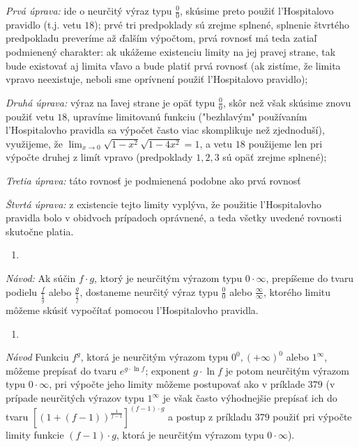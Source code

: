 \textit{Prvá úprava:}
ide o neurčitý výraz typu $\frac{0}{0}$, skúsime preto použiť l'Hospitalovo pravidlo (t.j. vetu $18$); prvé tri predpoklady sú zrejme splnené, splnenie štvrtého predpokladu preveríme až ďalším výpočtom, prvá rovnosť má teda zatiaľ podmienený charakter: ak ukážeme existenciu limity na jej pravej strane, tak bude existovať aj limita vľavo a bude platiť prvá rovnosť (ak zistíme, že limita vpravo neexistuje, neboli sme oprívnení použiť l'Hospitalovo pravidlo);

\textit{Druhá úprava:}
výraz na ľavej strane je opäť typu $\frac{0}{0}$, skôr než však skúsime znovu použiť vetu $18$, upravíme limitovanú funkciu ("bezhlavým" používaním l'Hospitalovho pravidla sa výpočet často viac skomplikuje než zjednoduší), využijeme, že $\lim_{x\rightarrow 0}\sqrt{1-x^2}\sqrt{1-4x^2}=1$, a vetu $18$ použijeme len pri výpočte druhej z limít vpravo (predpoklady $1,2,3$ sú opäť zrejme splnené);

\textit{Tretia úprava:}
táto rovnosť je podmienená podobne ako prvá rovnosť

\textit{Štvrtá úprava:}
z existencie tejto limity vyplýva, že použitie l'Hospitalovho pravidla bolo v obidvoch prípadoch oprávnené, a teda všetky uvedené rovnosti skutočne platia.

\begin{enumerate}[resume]
	\item {}
\end{enumerate}

\textit{Návod:}
Ak súčin $f\cdot g$, ktorý je neurčitým výrazom typu $0\cdot\infty$, prepíšeme do tvaru podielu $\frac{f}{\frac{1}{g}}$ alebo $\frac{g}{\frac{1}{f}}$, dostaneme neurčitý výraz typu $\frac{0}{0}$ alebo $\frac{\infty}{\infty}$, ktorého limitu môžeme skúsiť vypočítať pomocou l'Hospitalovho pravidla.

\begin{enumerate}[resume]
	\item {}
\end{enumerate}

\textit{Návod}
Funkciu $f^g$, ktorá je neurčitým výrazom typu $0^0,(+\infty)^0$ alebo $1^{\infty}$, môžeme prepísať do tvaru $e^{g\cdot\ln f}$; exponent $g\cdot\ln f$ je potom neurčitým výrazom typu $0\cdot\infty$, pri výpočte jeho limity môžeme postupovať ako v príklade $379$ (v prípade neurčitých výrazov typu $1^{\infty}$ je však často výhodnejšie prepísať ich do tvaru $[(1+(f-1))^{\frac{1}{f-1}}]^{(f-1)\cdot g}$ a postup z príkladu $379$ použiť pri výpočte limity funkcie $(f-1)\cdot g$, ktorá je neurčitým výrazom typu $0\cdot\infty$).


